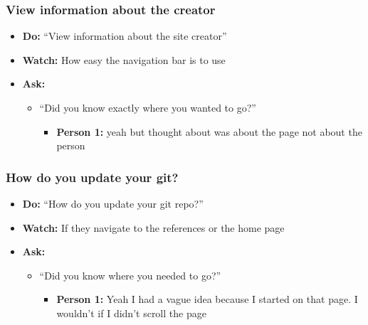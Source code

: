 \subsubsection{View information about the creator}
\begin{itemize}
	\item\textbf{Do:} ``View information about the site creator''
	\item\textbf{Watch:} How easy the navigation bar is to use
	\item\textbf{Ask:}
	\begin{itemize}
		\item ``Did you know exactly where you wanted to go?''
		\begin{itemize}
			\item\textbf{Person 1:} yeah but thought about was about the page not about the person
		\end{itemize}
	\end{itemize}	
\end{itemize}


\subsubsection{How do you update your git?}
\begin{itemize}
	\item\textbf{Do:} ``How do you update your git repo?''
	\item\textbf{Watch:} If they navigate to the references or the home page
	\item\textbf{Ask:}
	\begin{itemize}
		\item ``Did you know where you needed to go?''
		\begin{itemize}
			\item\textbf{Person 1:} Yeah I had a vague idea because I started on that page. I wouldn't if I didn't scroll the page
		\end{itemize}
	\end{itemize}	
\end{itemize}
